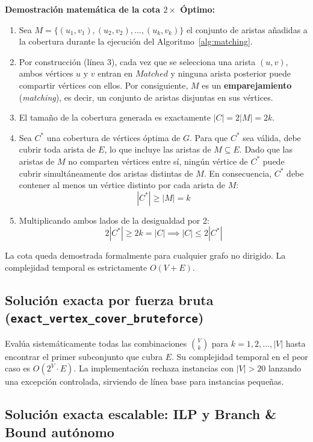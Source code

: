 \documentclass[11pt,a4paper]{article}
\begin{document}
\textbf{Demostración matemática de la cota $2 \times$ Óptimo:}
\begin{enumerate}
	\item Sea $M = \{(u_1, v_1), (u_2, v_2), \dots, (u_k, v_k)\}$ el conjunto de aristas añadidas a la cobertura durante la ejecución del Algoritmo~\ref{alg:matching}.
	\item Por construcción (línea 3), cada vez que se selecciona una arista $(u, v)$, ambos vértices $u$ y $v$ entran en $Matched$ y ninguna arista posterior puede compartir vértices con ellos. Por consiguiente, $M$ es un \textbf{emparejamiento} (\textit{matching}), es decir, un conjunto de aristas disjuntas en sus vértices.
	\item El tamaño de la cobertura generada es exactamente $|C| = 2|M| = 2k$.
	\item Sea $C^*$ una cobertura de vértices óptima de $G$. Para que $C^*$ sea válida, debe cubrir toda arista de $E$, lo que incluye las aristas de $M \subseteq E$. Dado que las aristas de $M$ no comparten vértices entre sí, ningún vértice de $C^*$ puede cubrir simultáneamente dos aristas distintas de $M$. En consecuencia, $C^*$ debe contener al menos un vértice distinto por cada arista de $M$:
	\begin{equation}
		|C^*| \ge |M| = k
	\end{equation}
	\item Multiplicando ambos lados de la desigualdad por 2:
	\begin{equation}
		2|C^*| \ge 2k = |C| \implies |C| \le 2|C^*|
	\end{equation}
\end{enumerate}
La cota queda demostrada formalmente para cualquier grafo no dirigido. La complejidad temporal es estrictamente \textbf{$O(V + E)$}.

\subsection{Solución exacta por fuerza bruta (\texttt{exact\_vertex\_cover\_bruteforce})}
Evalúa sistemáticamente todas las combinaciones $\binom{V}{k}$ para $k = 1, 2, \dots, |V|$ hasta encontrar el primer subconjunto que cubra $E$. Su complejidad temporal en el peor caso es $O(2^V \cdot E)$. La implementación rechaza instancias con $|V| > 20$ lanzando una excepción controlada, sirviendo de línea base para instancias pequeñas.

\subsection{Solución exacta escalable: ILP y Branch \& Bound autónomo}
\end{document}
